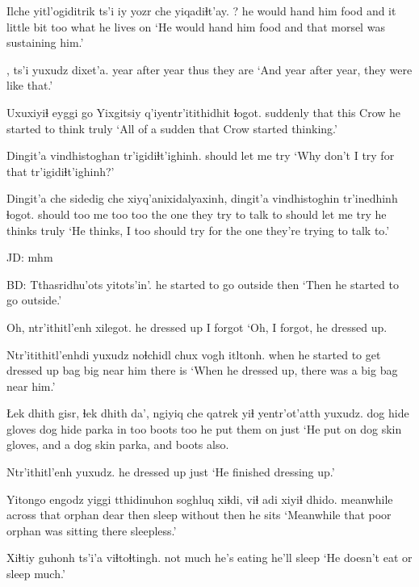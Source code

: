 \documentclass[12pt]{article}
\begin{document}
\gll Ilche yitl'ogiditrik         ts'i iy yozr       che yiqadiɬt'ay.
?    {he would hand him food} and it {little bit} too {what he lives on}
\glt `He would hand him food and that morsel was sustaining him.'
\glend
                                      
, ts'i yuxudz dixet'a.
{year after year }       {}    thus   {they are}
\glt `And year after year, they were like that.'
\glend

\gll Uxuxiyiɬ   eyggi go   Yixgitsiy q'iyentr'itithidhit ɬogot.
suddenly that  this Crow      {he started to think} truly
\glt `All of a sudden that Crow started thinking.'
\glend

\gll Dingit'a vindhistoghan tr'igidiɬt'ighinh.
should   {let me try}    
\glt `Why don't I try for that tr'igidiɬt'ighinh?'
\glend

\gll Dingit'a che sidedig che xiyq'anixidalyaxinh,        dingit'a vindhistoghin tr'inedhinh ɬogot.
should   too {me too}  too {the one they try to talk to} should  {let me try} {he thinks}   truly
\glt `He thinks, I too should try for the one they're trying to talk to.'
\glend

JD:  mhm

BD:
\gll Tthasridhu'ots           yitots'in'.
{he started to go outside} then
\glt `Then he started to go outside.'
\glend

\gll Oh, ntr'ithitl'enh xilegot.  
{} {he dressed up}  {I forgot}
\glt `Oh, I forgot, he dressed up.
\glend

\gll Ntr'itithitl'enhdi yuxudz noɬchidl chux vogh    itltonh.
{when he started to get dressed up} {}   bag      big  {near him} {there is}
\glt `When he dressed up, there was a big bag near him.'
\glend

\gll Łek dhith gisr,  ɬek dhith da',  ngiyiq che qatrek yiɬ yentr'ot'atth  yuxudz.
dog hide  gloves dog hide  parka in     too boots   too {he put them on} just
\glt `He put on dog skin gloves, and a dog skin parka, and boots also. 
\glend

\gll Ntr'ithitl'enh yuxudz.
{he dressed up}  just
\glt `He finished dressing up.'
\glend

\gll Yitongo   engodz yiggi tthidinuhon soghluq xiɬdi, viɬ   adi     xiyiɬ dhido.
meanwhile across that  orphan      dear    then  sleep without then  {he sits}
\glt `Meanwhile that poor orphan was sitting there sleepless.'
\glend

\gll Xiɬtiy guhonh ts'i'a viɬtoɬtingh.
{not much} {he's eating} {} {he'll sleep}
\glt `He doesn't eat or sleep much.'
\glend
\end{document}
